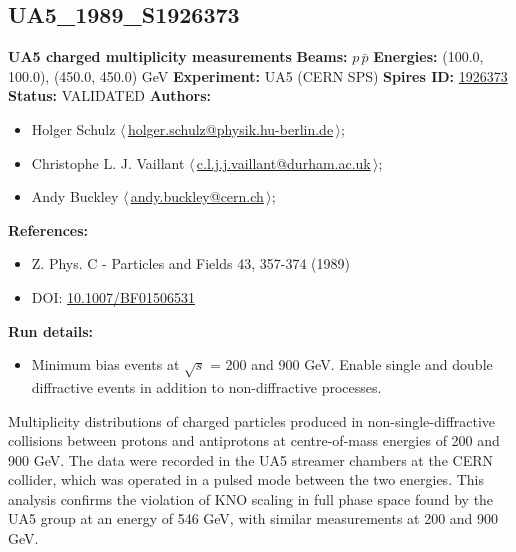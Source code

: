 \clearpage


\clearpage

\subsection[UA5\_1989\_S1926373]{UA5\_1989\_S1926373\,\cite{Ansorge:1988kn}}
\textbf{UA5 charged multiplicity measurements}\newline
\textbf{Beams:} $p$\,$\bar{p}$ \newline
\textbf{Energies:} (100.0, 100.0), (450.0, 450.0) GeV \newline
\textbf{Experiment:} UA5 (CERN SPS) \newline
\textbf{Spires ID:} \href{http://www.slac.stanford.edu/spires/find/hep/www?rawcmd=key+1926373}{1926373}\newline
\textbf{Status:} VALIDATED\newline
\textbf{Authors:}
\begin{itemize}
  \item Holger Schulz $\langle\,$\href{mailto:holger.schulz@physik.hu-berlin.de}{holger.schulz@physik.hu-berlin.de}$\,\rangle$;
  \item Christophe L. J. Vaillant $\langle\,$\href{mailto:c.l.j.j.vaillant@durham.ac.uk}{c.l.j.j.vaillant@durham.ac.uk}$\,\rangle$;
  \item Andy Buckley $\langle\,$\href{mailto:andy.buckley@cern.ch}{andy.buckley@cern.ch}$\,\rangle$;
\end{itemize}
\textbf{References:}
\begin{itemize}
  \item Z. Phys. C - Particles and Fields 43, 357-374 (1989)
  \item DOI: \href{http://dx.doi.org/10.1007/BF01506531}{10.1007/BF01506531}
\end{itemize}
\textbf{Run details:}
\begin{itemize}

  \item Minimum bias events at \ensuremath{\sqrt{s}} = 200 and 900 GeV. Enable single and double diffractive events in addition to non-diffractive processes.\end{itemize}

\noindent Multiplicity distributions of charged particles produced in non-single-diffractive collisions between protons and antiprotons at centre-of-mass energies of 200 and 900 GeV. The data were recorded in the UA5 streamer chambers at the CERN collider, which was operated in a pulsed mode between the two energies. This analysis confirms the violation of KNO scaling in full phase space found by the UA5 group at an energy of 546 GeV, with similar measurements at 200 and 900 GeV.

